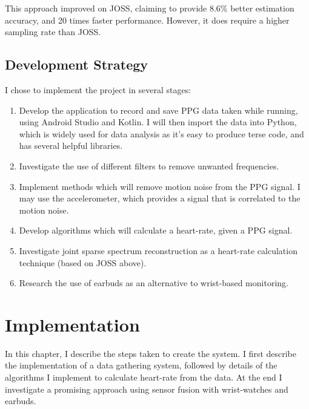 \documentclass[12pt,a4paper,twoside,openany]{report}
\begin{document}
This approach improved on JOSS, claiming to provide 8.6\% better estimation
accuracy, and 20 times faster performance. However, it does require a higher
sampling rate than JOSS.



\section{Development Strategy}

I chose to implement the project in several stages:

\begin{enumerate}
	\item Develop the application to record and save PPG data taken while
		running, using Android Studio and Kotlin. I will then import the data
		into Python, which is widely used for data analysis as it's
		easy to produce terse code, and has several helpful
		libraries.

	\item Investigate the use of different filters to remove unwanted frequencies.

	\item Implement methods which will remove motion noise from the PPG
		signal. I may use the accelerometer, which provides a signal
		that is correlated to
		the motion noise.

	\item Develop algorithms which will calculate a heart-rate, given a
		PPG signal.

	\item Investigate joint sparse spectrum reconstruction as a heart-rate
		calculation technique (based on JOSS above).

	\item Research the use of earbuds as an alternative to wrist-based
		monitoring.

\end{enumerate}


\chapter{Implementation}

In this chapter, I describe the steps taken to create the system. I first
describe the implementation of a data gathering system, followed by details of
the algorithms I implement to calculate heart-rate from the data. At the end
I investigate a promising approach using sensor fusion with 
wrist-watches and earbuds.
\end{document}
